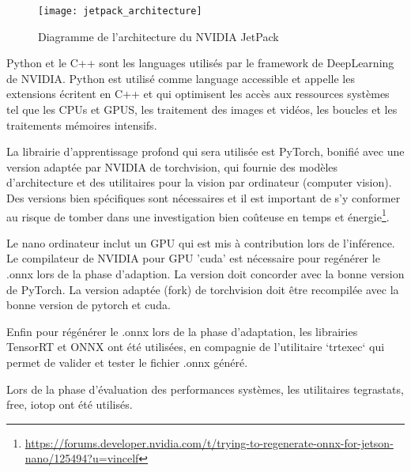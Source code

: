 \begin{figure}[H]
    \centering
    \texttt{[image: jetpack\_architecture]}
    \caption[Diagramme de l'architecture du NVIDIA JetPack]{Diagramme de l'architecture du NVIDIA JetPack\protect\footnotemark}
    \label{fig:jetpack_architecture}
\end{figure}
\par Python et le C++ sont les languages utilisés par le framework de DeepLearning de NVIDIA. Python est utilisé comme language accessible et appelle les extensions écritent en C++ et qui optimisent les accès aux ressources systèmes tel que les CPUs et GPUS, les traitement des images et vidéos, les boucles et les traitements mémoires intensifs.
\par La librairie d’apprentissage profond qui sera utilisée est PyTorch, bonifié avec une version adaptée par NVIDIA de torchvision, qui fournie des modèles d'architecture et des utilitaires pour la vision par ordinateur (computer vision). Des versions bien spécifiques sont nécessaires et il est important de s'y conformer au risque de tomber dans une investigation bien coûteuse en temps et énergie\footnote{\url{https://forums.developer.nvidia.com/t/trying-to-regenerate-onnx-for-jetson-nano/125494?u=vincelf}}.
\par Le nano ordinateur inclut un GPU qui est mis à contribution lors de l'inférence. Le compilateur de NVIDIA pour GPU 'cuda' est nécessaire pour regénérer le .onnx lors de la phase d'adaption. La version doit concorder avec la bonne version de PyTorch. La version adaptée (fork) de torchvision doit être recompilée avec la bonne version de pytorch et cuda. 
\par Enfin pour régénérer le .onnx lors de la phase d'adaptation, les librairies TensorRT et ONNX ont été utilisées, en compagnie de l'utilitaire `trtexec` qui permet de valider et tester le fichier .onnx généré.
\par Lors de la phase d'évaluation des performances systèmes, les utilitaires tegrastats, free, iotop ont été utilisés.
